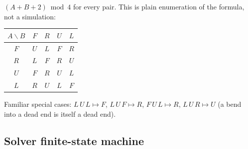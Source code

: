 \documentclass[11pt,a4paper]{article}
\theoremstyle{plain}
\theoremstyle{definition}
\begin{document}
$(A+B+2)\bmod 4$ for every pair. This is plain enumeration of the formula,
not a simulation:

\begin{center}
\small
\begin{tabular}{@{}c|cccc@{}}
\toprule
$A\backslash B$ & $F$ & $R$ & $U$ & $L$ \\
\midrule
$F$ & $U$ & $L$ & $F$ & $R$ \\
$R$ & $L$ & $F$ & $R$ & $U$ \\
$U$ & $F$ & $R$ & $U$ & $L$ \\
$L$ & $R$ & $U$ & $L$ & $F$ \\
\bottomrule
\end{tabular}
\end{center}

Familiar special cases: $L\,U\,L\mapsto F$, $L\,U\,F\mapsto R$,
$F\,U\,L\mapsto R$, $L\,U\,R\mapsto U$ (a bend into a dead end is itself a
dead end).

\subsection{Solver finite-state machine}\label{sec:fsm}
\end{document}
